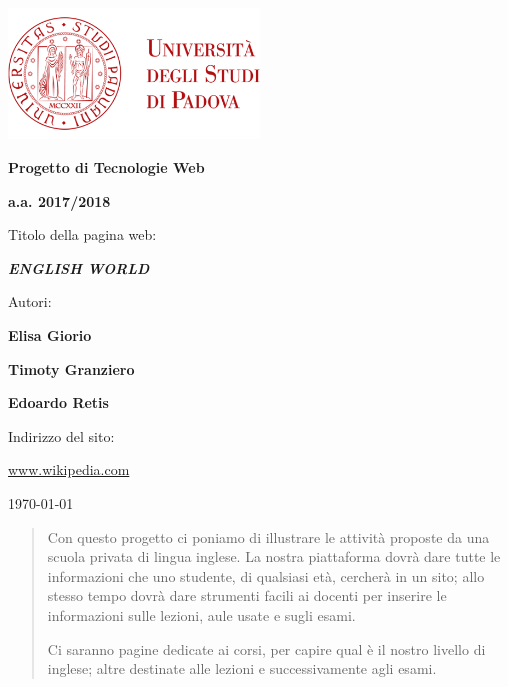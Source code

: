 \documentclass[12pt, a4paper]{article}
\begin{document}
\frenchspacing
\begin{titlepage}
	\centering
	\includegraphics[width=0.50\textwidth]{img/logo_unipd_color.png}\par\vspace{1cm} %
	
	{\LARGE\bfseries Progetto di Tecnologie Web \par}
	\vspace{1cm}
	{\Large\bfseries a.a. 2017/2018 \par}
	\vspace{2cm}
	
	{\Large Titolo della pagina web: \par}
	\vspace{0.5cm}
	
	{\LARGE\bfseries\itshape ENGLISH WORLD \par}
	
	\vfill 

	Autori: \par
	{\bfseries Elisa Giorio \par}
	{\bfseries Timoty Granziero \par}
	{\bfseries Edoardo Retis \par}
	
	\vfill

	Indirizzo del sito: \par
	\url{www.wikipedia.com}
	\vfill
	
	{\large \today\par}
	
\end{titlepage}

\tableofcontents 
\pagebreak

\begin{abstract}
Con questo progetto ci poniamo di illustrare le attività proposte da una scuola privata di lingua inglese. La nostra piattaforma dovrà dare tutte le informazioni che uno studente, di qualsiasi età, cercherà in un sito; allo stesso tempo dovrà dare strumenti facili ai docenti per inserire le informazioni sulle lezioni, aule usate e sugli esami.\par
Ci saranno pagine dedicate ai corsi, per capire qual è il nostro livello di inglese; altre destinate alle lezioni e successivamente agli esami.
\end{abstract}
\end{document}
